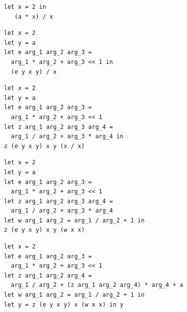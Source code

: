 \documentclass[manuscript, nonacm, anonymous]{acmart}
\begin{document}
\begin{listing*}[t]
\captionsetup[sub]{labelformat=parens}
\centering

\begin{minipage}[t]{0.45\textwidth}
  \begin{verbatim}
let x = 2 in
   (a * x) / x
  \end{verbatim}
  \subcaption{}
\end{minipage}
\hfill
\begin{minipage}[t]{0.45\textwidth}
  \begin{verbatim}
let x = 2
let y = a
let e arg_1 arg_2 arg_3 =
  arg_1 * arg_2 + arg_3 << 1 in
  (e y x y) / x
  \end{verbatim}
  \subcaption{}
\end{minipage}

\vspace{1em}

\begin{minipage}[t]{0.45\textwidth}
  \begin{verbatim}
let x = 2
let y = a
let e arg_1 arg_2 arg_3 =
  arg_1 * arg_2 + arg_3 << 1
let z arg_1 arg_2 arg_3 arg_4 =
  arg_1 / arg_2 + arg_3 * arg_4 in
z (e y x y) x y (x / x)
  \end{verbatim}
  \subcaption{}
\end{minipage}
\hfill
\begin{minipage}[t]{0.45\textwidth}
  \begin{verbatim}
let x = 2
let y = a
let e arg_1 arg_2 arg_3 =
  arg_1 * arg_2 + arg_3 << 1
let z arg_1 arg_2 arg_3 arg_4 =
  arg_1 / arg_2 + arg_3 * arg_4
let w arg_1 arg_2 = arg_1 / arg_2 + 1 in
z (e y x y) x y (w x x)
  \end{verbatim}
  \subcaption{}
\end{minipage}

\vspace{1em}

\begin{minipage}[t]{0.45\textwidth}
  \begin{verbatim}
let x = 2
let e arg_1 arg_2 arg_3 =
  arg_1 * arg_2 + arg_3 << 1
let z arg_1 arg_2 arg_4 =
  arg_1 / arg_2 + (z arg_1 arg_2 arg_4) * arg_4 + a
let w arg_1 arg_2 = arg_1 / arg_2 + 1 in
let y = z (e y x y) x (w x x) in y
  \end{verbatim}
  \subcaption{}
\end{minipage}

\caption{Terms corresponding to e-graphs in \autoref{fig:e-graph-example}}
\label{lst:terms-e-graph}
\end{listing*}
\end{document}
